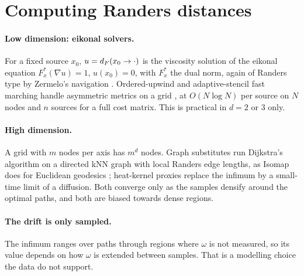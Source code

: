 \section{Computing Randers distances}
\label{app:randers}

\paragraph{Low dimension: eikonal solvers.}
For a fixed source $x_0$, $u=d_F(x_0\to\cdot)$ is the viscosity solution
of the eikonal equation $F^*_x(\nabla u)=1$, $u(x_0)=0$, with $F^*_x$ the
dual norm, again of Randers type by Zermelo's navigation
\citep{bao2000introduction}. Ordered-upwind and adaptive-stencil fast
marching handle asymmetric metrics on a grid
\citep{sethian2003ordered,mirebeau2014efficient}, at $O(N\log N)$ per
source on $N$ nodes and $n$ sources for a full cost matrix. This is
practical in $d=2$ or $3$ only.

\paragraph{High dimension.}
A grid with $m$ nodes per axis has $m^d$ nodes. Graph substitutes run
Dijkstra's algorithm on a directed kNN graph with local Randers edge
lengths, as Isomap does for Euclidean geodesics
\citep{tenenbaum2000global}; heat-kernel proxies replace the infimum by a
small-time limit of a diffusion. Both converge only as the samples
densify around the optimal paths, and both are biased towards dense
regions.

\paragraph{The drift is only sampled.}
The infimum ranges over paths through regions where $\omega$ is not
measured, so its value depends on how $\omega$ is extended between
samples. That is a modelling choice the data do not support.

